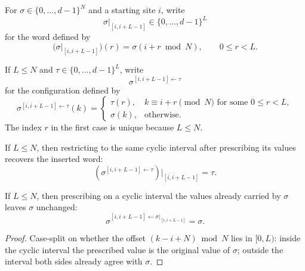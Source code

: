 \begin{definition}\label{def:extract_window}
    \leanok
    For $\sigma \in \{0,\ldots,d{-}1\}^{N}$ and a starting site $i$, write
    \[
        \sigma|_{[i,i+L-1]}
        \in \{0,\ldots,d{-}1\}^{L}
    \]
    for the word defined by
    \[
        \bigl(\sigma|_{[i,i+L-1]}\bigr)(r)
        =\sigma(i+r \bmod N),
        \qquad 0\le r<L.
    \]
\end{definition}

\begin{definition}\label{def:replace_window}
    \leanok
    If $L \le N$ and $\tau\in\{0,\ldots,d{-}1\}^{L}$, write
    \[
        \sigma^{[i,i+L-1]\leftarrow\tau}
    \]
    for the configuration defined by
    \[
        \sigma^{[i,i+L-1]\leftarrow\tau}(k)
        =
        \begin{cases}
            \tau(r),
                       & k\equiv i+r \pmod N\text{ for some }0\le r<L, \\
            \sigma(k), & \text{otherwise}.
        \end{cases}
    \]
    The index $r$ in the first case is unique because $L\le N$.
\end{definition}

\begin{lemma}\label{lem:extract_window_replace_window}
    \leanok
    If $L \le N$, then restricting to the same cyclic interval after prescribing
    its values recovers the inserted word:
    \[
        \left(\sigma^{[i,i+L-1]\leftarrow\tau}\right)|_{[i,i+L-1]}=\tau.
    \]
\end{lemma}

\begin{lemma}\label{lem:replace_window_extract_window}
    \leanok
    If $L \le N$, then prescribing on a cyclic interval the values already
    carried by $\sigma$ leaves $\sigma$ unchanged:
    \[
        \sigma^{[i,i+L-1]\leftarrow\sigma|_{[i,i+L-1]}}=\sigma.
    \]
\end{lemma}
\begin{proof}\leanok
    Case-split on whether the offset $(k - i + N) \bmod N$ lies in $[0,L)$:
    inside the cyclic interval the prescribed value is the original value of
    $\sigma$; outside the interval both sides already agree with $\sigma$.
\end{proof}

